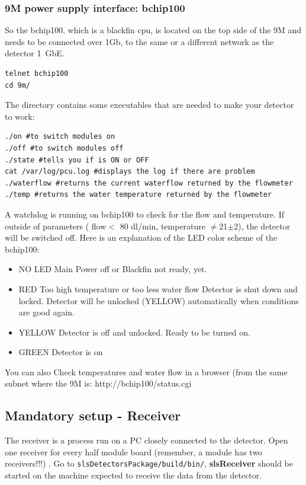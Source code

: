 \documentclass{article}
\begin{document}
\subsubsection{9M power supply interface: bchip100}\label{bchip100}
So the bchip100, which is a blackfin cpu, is located on the top side of the 9M and needs to be connected over 1Gb, to the same or a different network as the detector 1~GbE. 
 \begin{verbatim}
telnet bchip100
cd 9m/
\end{verbatim}
The directory contains some executables that are needed to make your detector to work:
 \begin{verbatim}
./on #to switch modules on
./off #to switch modules off
./state #tells you if is ON or OFF
cat /var/log/pcu.log #displays the log if there are problem
./waterflow #returns the current waterflow returned by the flowmeter
./temp #returns the water temperature returned by the flowmeter
 \end{verbatim}
A watchdog is running on bchip100 to check for the flow and temperature. If outside of parameters ( flow$<$ 80 dl/min, temperature $\neq$21$\pm$2), the detector will be switched off. 
Here is an explanation of the LED color scheme of the bchip100: 
\begin{itemize}
\item NO LED  Main Power off or Blackfin not ready, yet.
\item RED     Too high temperature or too less water flow
        Detector is shut down and locked.
        Detector will be unlocked (YELLOW) automatically when conditions are good again.
\item YELLOW  Detector is off and unlocked. Ready to be turned on.
\item GREEN   Detector is on
\end{itemize}
You can also Check temperatures and water flow in a browser (from the same subnet where the 9M is: http://bchip100/status.cgi

\subsection{Mandatory setup - Receiver}

The receiver is a process run on a PC closely connected to the detector. Open one receiver for every half module board (remember, a module has two receivers!!!) . Go to {\tt{slsDetectorsPackage/build/bin/}}, \textbf{slsReceiver} should be started on the machine expected to receive the data from the detector.
\end{document}
